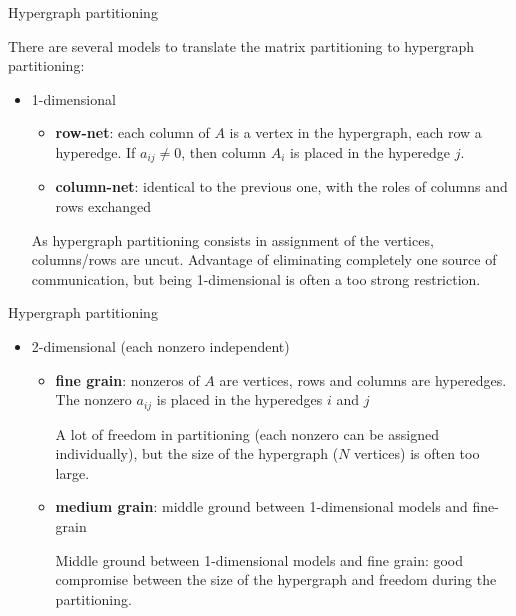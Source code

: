 \begin{frame}{Hypergraph partitioning}

	There are several models to translate the matrix partitioning to hypergraph partitioning:

	\begin{itemize}
		\item 1-dimensional
		\begin{itemize}\itemsep=0.3cm
				\item\textbf{row-net}: each column of $A$ is a vertex in the hypergraph, each row a hyperedge. If $a_{ij} \neq 0$, then column $A_i$ is placed in the hyperedge $j$.
				\item \textbf{column-net}: identical to the previous one, with the roles of columns and rows exchanged
			\end{itemize}
			\vspace{0.5cm}
As hypergraph partitioning consists in assignment of the vertices, columns/rows are uncut. Advantage of eliminating completely one source of communication, but being 1-dimensional is often a too strong restriction.
\end{itemize}
\end{frame}

\begin{frame}{Hypergraph partitioning}
	\begin{itemize}
		\item 2-dimensional (each nonzero independent)
			\begin{itemize}
					\vspace{0.2cm}
				\item \textbf{fine grain}: nonzeros of $A$ are vertices, rows and columns are hyperedges. The nonzero $a_{ij}$ is placed in the hyperedges $i$ and $j$

					\vspace{0.2cm}

				A lot of freedom in partitioning (each nonzero can be assigned individually), but the size of the hypergraph ($N$ vertices) is often too large.

					\vspace{0.2cm}
				\item \textbf{medium grain}: middle ground between 1-dimensional models and fine-grain

					\vspace{0.2cm}

					Middle ground between 1-dimensional models and fine grain: good compromise between the size of the hypergraph and freedom during the partitioning.

			\end{itemize}
	\end{itemize}

\end{frame}

